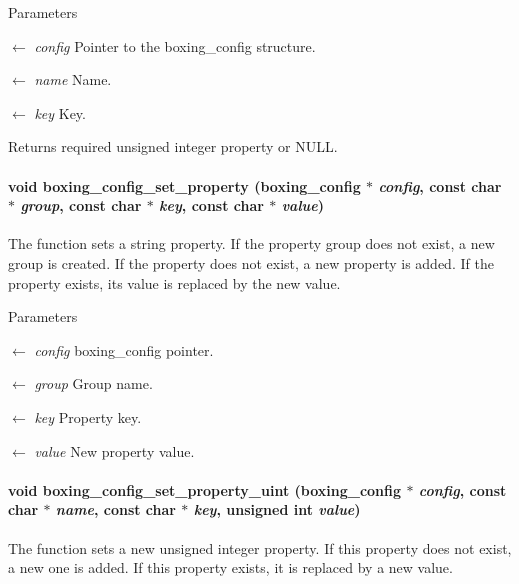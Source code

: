 \begin{DoxyParams}{Parameters}
\item[\mbox{$\leftarrow$} {\em config}]Pointer to the boxing\_\-config structure. \item[\mbox{$\leftarrow$} {\em name}]Name. \item[\mbox{$\leftarrow$} {\em key}]Key. \end{DoxyParams}
\begin{DoxyReturn}{Returns}
required unsigned integer property or NULL. 
\end{DoxyReturn}
\hypertarget{group__config_gaba83318eb9eab4e010742c737b1f5782}{
\paragraph[{boxing\_\-config\_\-set\_\-property}]{\setlength{\rightskip}{0pt plus 5cm}void boxing\_\-config\_\-set\_\-property ({\bf boxing\_\-config} $\ast$ {\em config}, \/  const char $\ast$ {\em group}, \/  const char $\ast$ {\em key}, \/  const char $\ast$ {\em value})}\hfill}
\label{group__config_gaba83318eb9eab4e010742c737b1f5782}
The function sets a string property. If the property group does not exist, a new group is created. If the property does not exist, a new property is added. If the property exists, its value is replaced by the new value.


\begin{DoxyParams}{Parameters}
\item[\mbox{$\leftarrow$} {\em config}]boxing\_\-config pointer. \item[\mbox{$\leftarrow$} {\em group}]Group name. \item[\mbox{$\leftarrow$} {\em key}]Property key. \item[\mbox{$\leftarrow$} {\em value}]New property value. \end{DoxyParams}
\hypertarget{group__config_gaae0ab5e0bb90813ced395324ca46f2b0}{
\paragraph[{boxing\_\-config\_\-set\_\-property\_\-uint}]{\setlength{\rightskip}{0pt plus 5cm}void boxing\_\-config\_\-set\_\-property\_\-uint ({\bf boxing\_\-config} $\ast$ {\em config}, \/  const char $\ast$ {\em name}, \/  const char $\ast$ {\em key}, \/  unsigned int {\em value})}\hfill}
\label{group__config_gaae0ab5e0bb90813ced395324ca46f2b0}
The function sets a new unsigned integer property. If this property does not exist, a new one is added. If this property exists, it is replaced by a new value.



